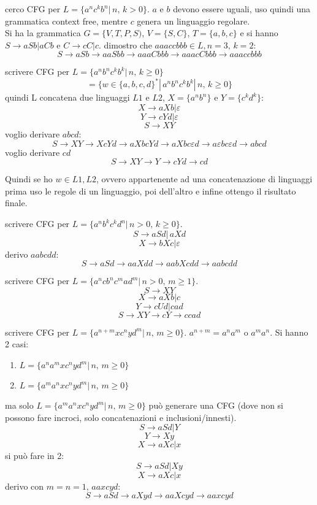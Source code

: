 \documentclass[a4paper,12pt, oneside]{book}
\begin{document}
\begin{esempio}
	cerco CFG per $L=\{a^n c^k b^n|\,n,\,k>0\}$. $a$ e $b$ devono essere uguali, uso quindi una grammatica context free, mentre $c$ genera un linguaggio regolare.\\
	Si ha la grammatica $G=\{V,T,P,S)$, $V=\{S,C\}$, $T=\{a,b,c\}$ e si hanno $S\to aSb|aCb$ e $C\to cC|c$. dimostro che $aaaccbbb\in L, n=3,\, k=2$:
	$$S\to aSb \to aaSbb\to aaaCbbb\to aaacCbbb\to aaaccbbb$$
\end{esempio}
\begin{esempio}
	scrivere CFG per $L=\{a^nb^nc^kb^k|\, n,\,k\geq 0\}
	$
	$$=\{w\in\{a,b,c,d\}^*|\,a^nb^nc^kb^k|\, n,\,k\geq 0\}$$
	quindi L concatena due linguaggi $L1$ e $L2$, $X=\{a^nb^n\}$ e $Y=\{c^kd^k\}$:
	$$X\to aXb | \varepsilon$$
	$$Y\to cYd | \varepsilon$$
	$$S\to XY$$
	voglio derivare $abcd$:
	$$S\to XY \to XcYd\to aXbcYd\to aXbc\varepsilon d\to a\varepsilon bc\varepsilon d\to abcd$$
	voglio derivare $cd$
	$$S\to XY\to Y\to cYd\to cd$$
\end{esempio}
Quindi se ho $w\in L1, L2$, ovvero appartenente ad una concatenazione di linguaggi prima uso le regole di un linguaggio, poi dell'altro e infine ottengo il risultato finale.\\
\begin{esempio}
	scrivere CFG per $L=\{a^nb^kc^kd^n|\, n>0,\, k\geq 0\}
	$.
	$$S\to aSd|\, aXd$$
	$$X\to bXc| \varepsilon$$
	derivo $aabcdd$:
	$$S\to aSd\to aaXdd\to aabXcdd\to aabcdd$$
\end{esempio}
\begin{esempio}
	scrivere CFG per $L=\{a^ncb^nc^mad^m|\, n>0,\, m\geq 1\}
	$.
	$$S\to XY$$
	$$X\to aXb|c$$
	$$Y\to cUd| cad$$
	$$S\to XY\to cY\to ccad$$
\end{esempio}
\begin{esempio}
	scrivere CFG per $L=\{a^{n+m}xc^nyd^m|\, n,\, m\geq 0\}
	$. $a^{n+m}=a^na^m \mbox{ o } a^ma^n$. Si hanno 2 casi:
	\begin{enumerate}
		\item $L=\{a^na^m xc^nyd^m|\, n,\, m\geq 0\}
		      $
		\item $L=\{a^ma^n xc^nyd^m|\, n,\, m\geq 0\}
		      $
	\end{enumerate}
	ma solo  $L=\{a^ma^n xc^nyd^m|\, n,\, m\geq 0\}
	$ può generare una CFG (dove non si possono fare incroci, solo concatenazioni e inclusioni/innesti).
	$$S\to aSd| Y$$
	$$Y\to Xy$$
	$$X\to aXc|x$$
	si può fare in 2:
	$$S\to aSd| Xy$$
	$$X\to aXc|x$$
	derivo con $m=n=1$, $aaxcyd$:
	$$S\to aSd\to aXyd\to aaXcyd\to aaxcyd$$
\end{esempio}
\end{document}

